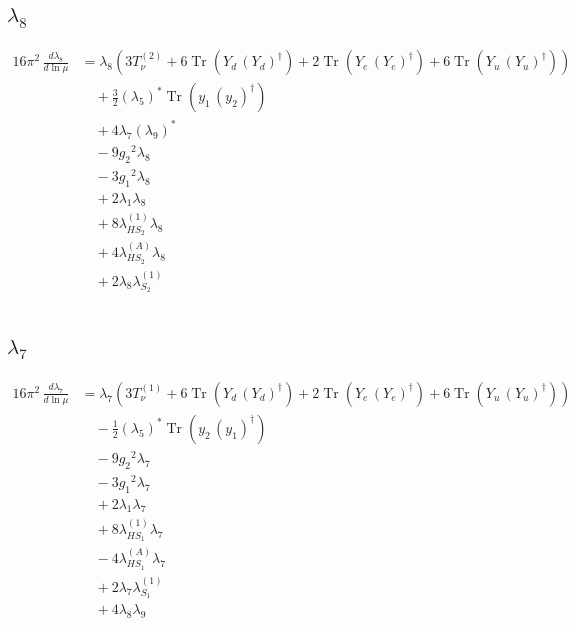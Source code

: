 \documentclass[10pt,a4paper]{article}
\begin{document}
\subsection*{$\lambda_{8}$}
\begin{align*}
16\pi^2\,\frac{d \lambda_{8}}{d\ln\mu} &={\lambda_{8}} (3 T_{\nu}^{(2)}+6 \operatorname{Tr}\!\left({Y_d}\,\left({Y_d}\right)^{\dagger}\right)+2 \operatorname{Tr}\!\left({Y_e}\,\left({Y_e}\right)^{\dagger}\right)+6 \operatorname{Tr}\!\left({Y_u}\,\left({Y_u}\right)^{\dagger}\right)) \\
&\quad +\frac{3}{2} \left({\lambda_5}\right)^{*} \operatorname{Tr}\!\left({y_1}\,\left({y_2}\right)^{\dagger}\right) \\
&\quad +4 {\lambda_{7}} \left({\lambda_{9}}\right)^{*} \\
&\quad -9 {g_2}^2 {\lambda_{8}} \\
&\quad -3 {g_1}^2 {\lambda_{8}} \\
&\quad +2 {\lambda_1} {\lambda_{8}} \\
&\quad +8 {\lambda_{HS_2}^{(1)}} {\lambda_{8}} \\
&\quad +4 {\lambda_{HS_2}^{(A)}} {\lambda_{8}} \\
&\quad +2 {\lambda_{8}} {\lambda_{S_2}^{(1)}} \\
\end{align*}
\subsection*{$\lambda_{7}$}
\begin{align*}
16\pi^2\,\frac{d \lambda_{7}}{d\ln\mu} &={\lambda_{7}} (3 T_{\nu}^{(1)}+6 \operatorname{Tr}\!\left({Y_d}\,\left({Y_d}\right)^{\dagger}\right)+2 \operatorname{Tr}\!\left({Y_e}\,\left({Y_e}\right)^{\dagger}\right)+6 \operatorname{Tr}\!\left({Y_u}\,\left({Y_u}\right)^{\dagger}\right)) \\
&\quad -\frac{1}{2} \left({\lambda_5}\right)^{*} \operatorname{Tr}\!\left({y_2}\,\left({y_1}\right)^{\dagger}\right) \\
&\quad -9 {g_2}^2 {\lambda_{7}} \\
&\quad -3 {g_1}^2 {\lambda_{7}} \\
&\quad +2 {\lambda_1} {\lambda_{7}} \\
&\quad +8 {\lambda_{HS_1}^{(1)}} {\lambda_{7}} \\
&\quad -4 {\lambda_{HS_1}^{(A)}} {\lambda_{7}} \\
&\quad +2 {\lambda_{7}} {\lambda_{S_1}^{(1)}} \\
&\quad +4 {\lambda_{8}} {\lambda_{9}} \\
\end{align*}
\end{document}

